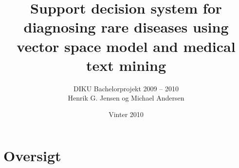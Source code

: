 \documentclass[xcolor=table]{beamer}
\title{ \textbf{Support decision system for diagnosing rare diseases using vector space model and medical text mining}}
\subtitle{{\footnotesize DIKU Bachelorprojekt 2009 -- 2010}\\{\tiny Henrik G. Jensen og Michael Andersen}}
\date{Vinter 2010}
\begin{document}
\begin{frame}
    \titlepage
\end{frame}

\section{Oversigt}

\subsection*{}





\end{document}
